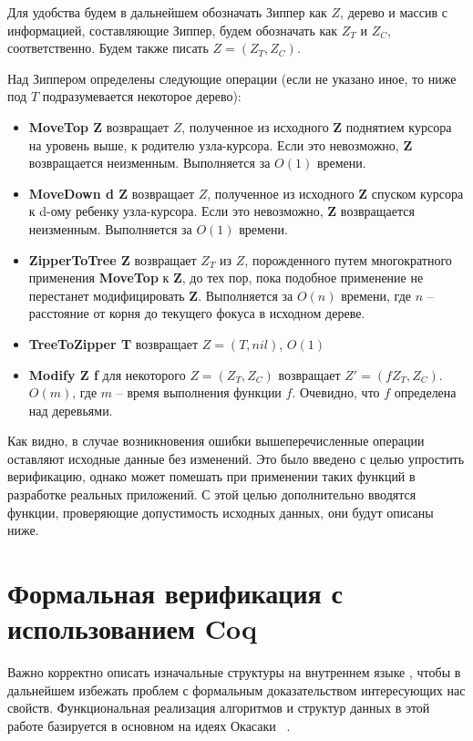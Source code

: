 Для удобства будем в дальнейшем обозначать Зиппер как $Z$, дерево и массив с информацией, составляющие Зиппер, будем обозначать как $Z_T$ и $Z_C$, соответственно. Будем также писать $Z = (Z_T, Z_C)$.

Над Зиппером определены следующие операции (если не указано иное, то ниже под $T$ подразумевается некоторое дерево):
\begin{itemize}
\item \textbf{MoveTop Z} возвращает $Z$, полученное из исходного \textbf{Z} поднятием курсора на уровень выше, к родителю узла-курсора. Если это невозможно, \textbf{Z} возвращается неизменным. Выполняется за $O(1)$ времени.
\item \textbf{MoveDown d Z} возвращает $Z$, полученное из исходного \textbf{Z} спуском курсора к d-ому ребенку узла-курсора. Если это невозможно, \textbf{Z} возвращается неизменным. Выполняется за $O(1)$ времени.
\item \textbf{ZipperToTree Z} возвращает $Z_T$ из $Z$, порожденного путем многократного применения \textbf{MoveTop} к \textbf{Z}, до тех пор, пока подобное применение не перестанет модифицировать \textbf{Z}. Выполняется за $O(n)$ времени, где $n$ -- расстояние от корня до текущего фокуса в исходном дереве.
\item \textbf{TreeToZipper T} возвращает $Z = (T, nil)$, $O(1)$
\item \textbf{Modify Z f} для некоторого $Z = (Z_T, Z_C)$ возвращает $Z' = (f Z_T, Z_C)$. $O(m)$, где $m$ -- время выполнения функции $f$. Очевидно, что $f$ определена над деревьями.
\end{itemize}

Как видно, в случае возникновения ошибки вышеперечисленные операции оставляют исходные данные без изменений. Это было введено с целью упростить верификацию, однако может помешать при применении таких функций в разработке реальных приложений. С этой целью дополнительно вводятся функции, проверяющие допустимость исходных данных, они будут описаны ниже.

\section{Формальная верификация с использованием Coq}

Важно корректно описать изначальные структуры на внутреннем языке \tcoq, чтобы в дальнейшем избежать проблем с формальным доказательством интересующих нас свойств. Функциональная реализация алгоритмов и структур данных в этой работе базируется в основном на идеях Окасаки ~\autocite{Okasaki1996}.

